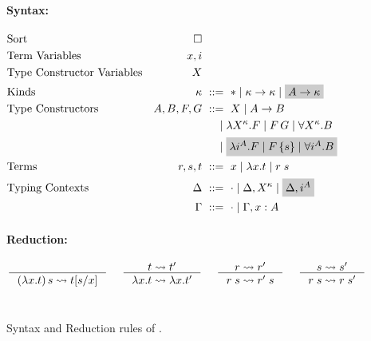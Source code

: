 \begin{figure}\begin{singlespace}
	\small
\paragraph{Syntax:}
\begin{align*}
\!\!\!\!\!\!\!\!&\text{Sort}
 	& \square
	\\
\!\!\!\!\!\!\!\!&\text{Term Variables}
 	& x,i
\\
\!\!\!\!\!\!\!\!&\text{Type Constructor Variables}
 	& X
\\
\!\!\!\!\!\!\!\!&\text{Kinds}
 	& \kappa		&~ ::= ~ *
				\mid \kappa -> \kappa
				\mid \newFi{A -> \kappa}
\\
\!\!\!\!\!\!\!\!&\text{Type Constructors}
	& A,B,F,G		&~ ::= ~ X
				\mid A -> B \\ &&& ~\quad
				\mid \lambda X^\kappa.F
				\mid F\,G
				\mid \forall X^\kappa . B \\ &&& ~\quad
				\mid \newFi{\lambda i^A.F
				\mid F\,\{s\}
				\mid \forall i^A . B}
\\
\!\!\!\!\!\!\!\!&\text{Terms}
	& r,s,t			&~ ::= ~ x \mid \lambda x.t \mid r\;s
\\
\!\!\!\!\!\!\!\!&\text{Typing Contexts}
	& \Delta		&~ ::= ~ \cdot
				\mid \Delta, X^\kappa
				\mid \newFi{\Delta, i^A} \\
&	& \Gamma		&~ ::= ~ \cdot
				\mid \Gamma, x : A
\end{align*}
\paragraph{Reduction:} 
\[ 
   \inference{}{(\lambda x.t)\,s \rightsquigarrow t[s/x]}
 ~~~~
   \inference{t \rightsquigarrow t'}{\lambda x.t \rightsquigarrow \lambda x.t'}
 ~~~~
   \inference{r \rightsquigarrow r'}{r\;s \rightsquigarrow r'\;s}
 ~~~~
   \inference{s \rightsquigarrow s'}{r\;s \rightsquigarrow r\;s'}
\]
~\\
\end{singlespace}
\caption{Syntax and Reduction rules of \Fi.}
\label{fig:Fi}
\end{figure}

